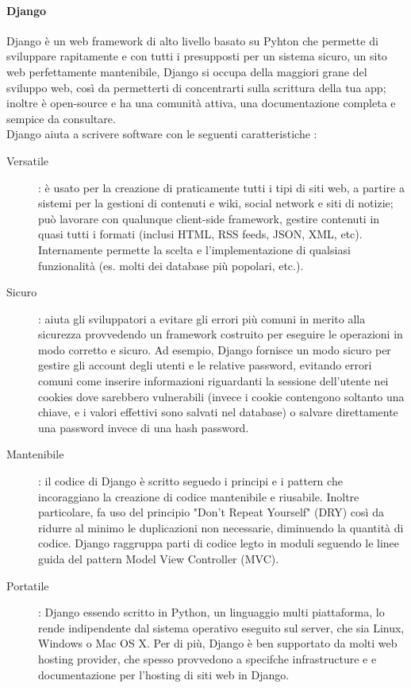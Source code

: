 \paragraph{Django}
Django è un web framework di alto livello basato su Pyhton che permette di sviluppare rapitamente e con tutti i presupposti per un sistema sicuro, un sito web
perfettamente mantenibile, Django si occupa della maggiori grane del sviluppo web, così da permetterti di concentrarti sulla scrittura della tua app; inoltre 
è open-source e ha una comunità attiva, una documentazione completa e sempice da consultare.
\ \\
Django aiuta a scrivere software con le seguenti caratteristiche \cite{django-documentation}:
\begin{description}
	\item[Versatile]: è usato per la creazione di praticamente tutti i tipi di siti web, a partire a sistemi per la gestioni di contenuti e wiki,
	social network e siti di notizie; può lavorare con qualunque client-side framework, gestire contenuti in quasi tutti i formati (inclusi HTML, 
	RSS feeds, JSON, XML, etc). Internamente permette la scelta e l'implementazione di qualsiasi funzionalità (es. molti dei database più popolari, etc.).
	\item[Sicuro]: aiuta gli sviluppatori a evitare gli errori più comuni in merito alla sicurezza provvedendo un framework costruito per eseguire 
	le operazioni in modo corretto e sicuro. Ad esempio, Django fornisce un modo sicuro per gestire gli account degli utenti e le relative
	password, evitando errori comuni come inserire informazioni riguardanti la sessione dell'utente nei cookies dove sarebbero vulnerabili (invece i cookie
	contengono soltanto una chiave, e i valori effettivi sono salvati nel database) o salvare direttamente una password invece di una hash password.
	\item[Mantenibile]: il codice di Django è scritto seguedo i principi e i pattern che incoraggiano la creazione di codice mantenibile e riusabile. Inoltre
	particolare, fa uso del principio "Don't Repeat Yourself" (DRY) così da ridurre al minimo le duplicazioni non necessarie, diminuendo la quantità di codice.
	Django raggruppa parti di codice legto in moduli seguendo le linee guida del pattern Model View Controller (MVC).
	\item[Portatile]: Django essendo scritto in Python, un linguaggio multi piattaforma, lo rende indipendente dal sistema operativo eseguito sul server, che
	sia Linux, Windows o Mac OS X. Per di più, Django è ben supportato da molti web hosting provider, che spesso provvedono a specifche infrastructure e 
	e documentazione per l'hosting di siti web in Django.
\end{description}
